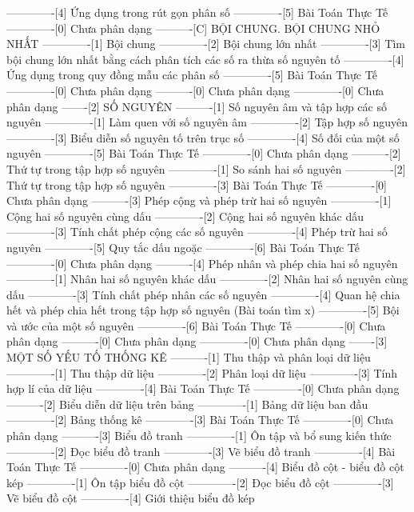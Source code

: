 -------------[4] Ứng dụng trong rút gọn phân số
-------------[5] Bài Toán Thực Tế
-------------[0] Chưa phân dạng
----------[C] BỘI CHUNG. BỘI CHUNG NHỎ NHẤT
-------------[1] Bội chung
-------------[2] Bội chung lớn nhất
-------------[3] Tìm bội chung lớn nhất bằng cách phân tích các số ra thừa số nguyên tố
-------------[4] Ứng dụng trong quy đồng mẫu các phân số
-------------[5] Bài Toán Thực Tế
-------------[0] Chưa phân dạng
----------[0] Chưa phân dạng
-------------[0] Chưa phân dạng
-------[2] SỐ NGUYÊN
----------[1] Số nguyên âm và tập hợp các số nguyên
-------------[1] Làm quen với số nguyên âm
-------------[2] Tập hợp số nguyên
-------------[3] Biểu diễn số nguyên tố trên trục số
-------------[4] Số đối của một số nguyên
-------------[5] Bài Toán Thực Tế
-------------[0] Chưa phân dạng
----------[2] Thứ tự trong tập hợp số nguyên
-------------[1] So sánh hai số nguyên
-------------[2] Thứ tự trong tập hợp số nguyên
-------------[3] Bài Toán Thực Tế
-------------[0] Chưa phân dạng
----------[3] Phép cộng và phép trừ hai số nguyên
-------------[1] Cộng hai số nguyên cùng dấu
-------------[2] Cộng hai số nguyên khác dấu
-------------[3] Tính chất phép cộng các số nguyên
-------------[4] Phép trừ hai số nguyên
-------------[5] Quy tắc dấu ngoặc
-------------[6] Bài Toán Thực Tế
-------------[0] Chưa phân dạng
----------[4] Phép nhân và phép chia hai số nguyên
-------------[1] Nhân hai số nguyên khác dấu
-------------[2] Nhân hai số nguyên cùng dấu
-------------[3] Tính chất phép nhân các số nguyên
-------------[4] Quan hệ chia hết và phép chia hết trong tập hợp số nguyên (Bài toán tìm x)
-------------[5] Bội và ước của một số nguyên
-------------[6] Bài Toán Thực Tế
-------------[0] Chưa phân dạng
----------[0] Chưa phân dạng
-------------[0] Chưa phân dạng
-------[3] MỘT SỐ YẾU TỐ THỐNG KÊ
----------[1] Thu thập và phân loại dữ liệu
-------------[1] Thu thập dữ liệu
-------------[2] Phân loại dữ liệu
-------------[3] Tính hợp lí của dữ liệu
-------------[4] Bài Toán Thực Tế
-------------[0] Chưa phân dạng
----------[2] Biểu diễn dữ liệu trên bảng
-------------[1] Bảng dữ liệu ban đầu
-------------[2] Bảng thống kê
-------------[3] Bài Toán Thực Tế
-------------[0] Chưa phân dạng
----------[3] Biểu đồ tranh
-------------[1] Ôn tập và bổ sung kiến thức
-------------[2] Đọc biểu đồ tranh
-------------[3] Vẽ biểu đồ tranh
-------------[4] Bài Toán Thực Tế
-------------[0] Chưa phân dạng
----------[4] Biểu đồ cột - biểu đồ cột kép
-------------[1] Ôn tập biểu đồ cột
-------------[2] Đọc biểu đồ cột
-------------[3] Vẽ biểu đồ cột
-------------[4] Giới thiệu biểu đồ kép
